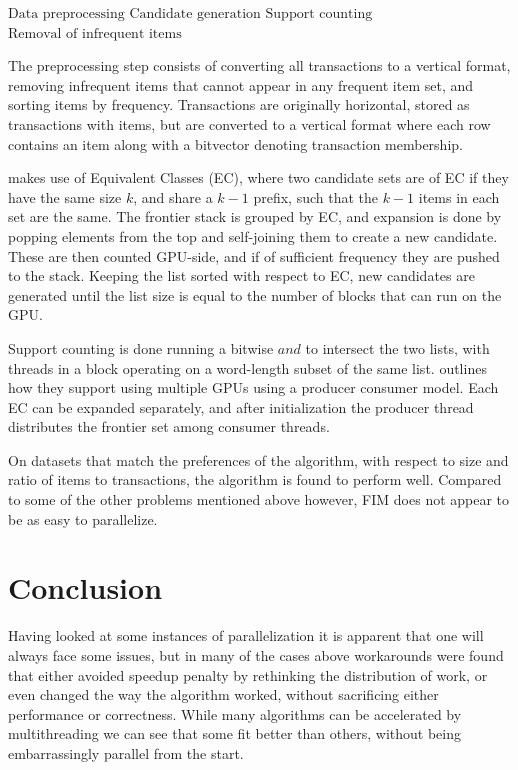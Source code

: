 \documentclass[twocolumn]{article} %
\begin{document}
		\begin{algorithmic}
			\State $\text{Data preprocessing}$
				\State $\text{Candidate generation}$
				\State $\text{Support counting}$
				\State $\text{Removal of infrequent items}$
			\EndWhile
		\end{algorithmic}
		
		The preprocessing step consists of converting all transactions to a vertical format, removing infrequent items that
		cannot appear in any frequent item set, and sorting items by frequency. Transactions are originally horizontal, stored
		as transactions with items, but are converted to a vertical format where each row contains an item along with a
		bitvector denoting transaction membership.
		
		\cite{zhang13} makes use of Equivalent Classes (EC), where two candidate sets are of EC if they have the same size $k$,
		and share a $k-1$ prefix, such that the $k-1$ items in each set are the same. The frontier stack is grouped by EC, and
		expansion is done by popping elements from the top and self-joining them to create a new candidate. These are then
		counted GPU-side, and if of sufficient frequency they are pushed to the stack. Keeping the list sorted with respect to
		EC, new candidates are generated until the list size is equal to the number of blocks that can run on the GPU.
		
		Support counting is done running a bitwise $and$ to intersect the two lists, with threads in a block operating on a
		word-length subset of the same list. \cite{zhang13} outlines how they support using multiple GPUs using a producer consumer
		model. Each EC can be expanded separately, and after initialization the producer thread distributes the frontier set
		among consumer threads.
		
		On datasets that match the preferences of the algorithm, with respect to size and ratio of items to transactions, the
		algorithm is found to perform well. Compared to some of the other problems mentioned above however, FIM does not
		appear to be as easy to parallelize.
		
	\section*{Conclusion}
		Having looked at some instances of parallelization it is apparent that one will always face some issues, but in many
		of the cases above workarounds were found that either avoided speedup penalty by rethinking the distribution of work,
		or even changed the way the algorithm worked, without sacrificing either performance or correctness. While many
		algorithms can be accelerated by multithreading we can see that some fit better than others, without being
		embarrassingly parallel from the start.
		
\end{document}
